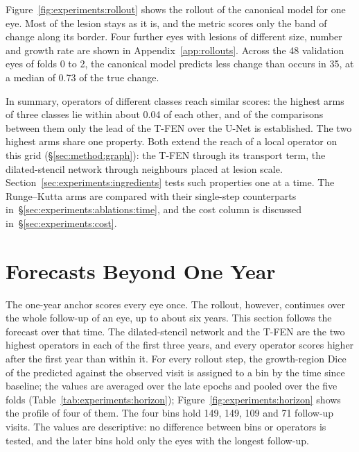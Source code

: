 Figure~\ref{fig:experiments:rollout} shows the rollout of the canonical
model for one eye. Most of the lesion stays as it is, and the metric scores
only the band of change along its border. Four further eyes with lesions
of different size, number and growth rate are shown in
Appendix~\ref{app:rollouts}. Across the 48 validation eyes of folds 0 to 2,
the canonical model predicts less change than occurs in 35, at a median of
0.73 of the true change.

In summary, operators of different classes reach similar scores: the
highest arms of three classes lie within about 0.04 of each other, and of the comparisons between them only the lead of the T-FEN over
the U-Net is established. The two highest arms share one property. Both
extend the reach of a local operator on this grid
(\S\ref{sec:method:graph}): the T-FEN through its transport term, the
dilated-stencil network through neighbours placed at lesion scale.
Section~\ref{sec:experiments:ingredients} tests such properties one at a
time. The Runge--Kutta arms are compared with their single-step
counterparts in~\S\ref{sec:experiments:ablations:time}, and the cost
column is discussed in~\S\ref{sec:experiments:cost}.


\section{Forecasts Beyond One Year}
\label{sec:experiments:horizon}

The one-year anchor scores every eye once. The rollout, however, continues
over the whole follow-up of an eye, up to about six years. This section
follows the forecast over that time. The dilated-stencil network and the
T-FEN are the two highest operators in each of the first three years, and
every operator scores higher after the first year than within it. For
every rollout step, the
growth-region Dice of the predicted against the observed visit is assigned
to a bin by the time since baseline; the values are averaged over the late
epochs and pooled over the five folds (Table~\ref{tab:experiments:horizon});
Figure~\ref{fig:experiments:horizon} shows the profile of four of them.
The four bins hold 149, 149, 109 and 71 follow-up visits. The values are
descriptive: no difference between bins or operators is tested, and the
later bins hold only the eyes with the longest follow-up.

